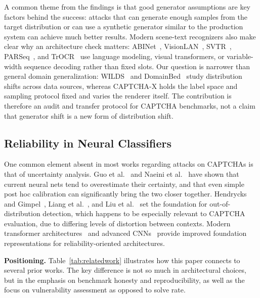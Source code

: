 \documentclass[pdflatex,sn-mathphys-num,iicol]{sn-jnl}
\begin{document}
A common theme from the findings is that good generator assumptions are key factors behind the success: attacks that can generate enough samples from the target distribution or can use a synthetic generator similar to the production system can achieve much better results. Modern scene-text recognizers also make clear why an architecture check matters: ABINet~\cite{abinet2021}, VisionLAN~\cite{visionlan2021}, SVTR~\cite{svtr2022}, PARSeq~\cite{parseq2022}, and TrOCR~\cite{trocr2023} use language modeling, visual transformers, or variable-width sequence decoding rather than fixed slots. Our question is narrower than general domain generalization: WILDS~\cite{wilds2021} and DomainBed~\cite{domainbed2021} study distribution shifts across data sources, whereas CAPTCHA-X holds the label space and sampling protocol fixed and varies the renderer itself. The contribution is therefore an audit and transfer protocol for CAPTCHA benchmarks, not a claim that generator shift is a new form of distribution shift.

\subsection{Reliability in Neural Classifiers}

One common element absent in most works regarding attacks on CAPTCHAs is that of uncertainty analysis. Guo et al.~\cite{guo2017calibration} and Naeini et al.~\cite{naeini2015obtaining} have shown that current neural nets tend to overestimate their certainty, and that even simple post hoc calibration can significantly bring the two closer together. Hendrycks and Gimpel~\cite{hendrycks2017baseline}, Liang et al.~\cite{liang2018enhancing}, and Liu et al.~\cite{liu2020energy} set the foundation for out-of-distribution detection, which happens to be especially relevant to CAPTCHA evaluation, due to differing levels of distortion between contexts. Modern transformer architectures~\cite{vaswani2017attention,dosovitskiy2021vit} and advanced CNNs~\cite{liu2022convnext} provide improved foundation representations for reliability-oriented architectures.


\textbf{Positioning.} Table~\ref{tab:relatedwork} illustrates how this paper connects to several prior works. The key difference is not so much in architectural choices, but in the emphasis on benchmark honesty and reproducibility, as well as the focus on vulnerability assessment as opposed to solve rate.
\end{document}
